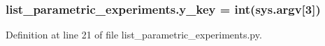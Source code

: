 \subsubsection[{\texorpdfstring{y\+\_\+key}{y_key}}]{\setlength{\rightskip}{0pt plus 5cm}list\+\_\+parametric\+\_\+experiments.\+y\+\_\+key = int(sys.\+argv\mbox{[}3\mbox{]})}\hypertarget{namespacelist__parametric__experiments_ac93205bc1c86f1e3bf8c370169ef0e60}{}\label{namespacelist__parametric__experiments_ac93205bc1c86f1e3bf8c370169ef0e60}


Definition at line 21 of file list\+\_\+parametric\+\_\+experiments.\+py.

